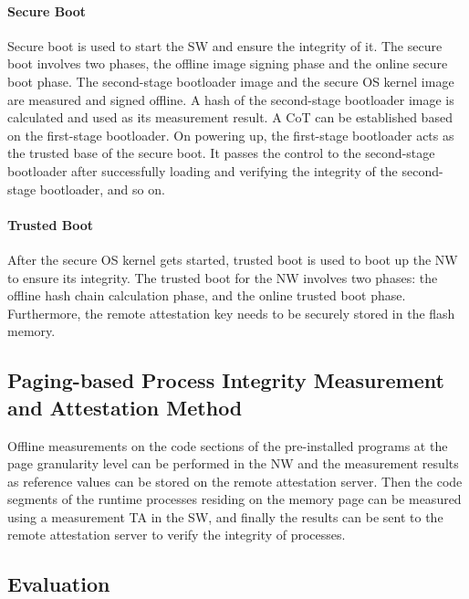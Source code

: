 \documentclass{article}
\begin{document}
\paragraph{Secure Boot}

Secure boot is used to start the SW and ensure the integrity of it. The secure boot involves two phases, the offline image signing phase and the online secure boot phase. The second-stage bootloader image and the secure OS kernel image are measured and signed offline. A hash of the second-stage bootloader image is calculated and used as its measurement result. A CoT can be established based on the first-stage bootloader. On powering up, the first-stage bootloader acts as the trusted base of the secure boot. It passes the control to the second-stage bootloader after successfully loading and verifying the integrity of the second-stage bootloader, and so on.

\paragraph{Trusted Boot}

After the secure OS kernel gets started, trusted boot is used to boot up the NW to ensure its integrity. The trusted boot for the NW involves two phases: the offline hash chain calculation phase, and the online trusted boot phase. Furthermore, the remote attestation key needs to be securely stored in the flash memory.

\subsection{Paging-based Process Integrity Measurement and Attestation Method}

Offline measurements on the code sections of the pre-installed programs at the page granularity level can be performed in the NW and the measurement results as reference values can be stored on the remote attestation server. Then the code segments of the runtime processes residing on the memory page can be measured using a measurement TA in the SW, and finally the results can be sent to the remote attestation server to verify the integrity of processes.

\subsection{Evaluation}


 
\end{document}

